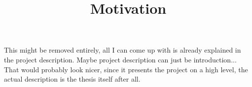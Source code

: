 
\title{Motivation}

This might be removed entirely, all I can come up with is already explained in the project description. Maybe project description can just be introduction... That would probably look nicer, since it presents the project on a high level, the actual description is the thesis itself after all.



